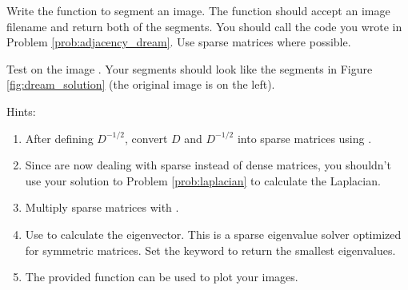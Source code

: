 \begin{problem} Write the function  to segment an image.
The function should accept an image filename and return both of the segments.
You should call the code you wrote in Problem \ref{prob:adjacency_dream}.
Use sparse matrices where possible.


Test on the image .
Your segments should look like the segments in Figure \ref{fig:dream_solution} (the original image is on the left).

Hints:
\begin{enumerate}
\item After defining $D^{-1/2}$, convert $D$ and $D^{-1/2}$ into sparse matrices using .
\item Since are now dealing with sparse instead of dense matrices, you shouldn't use your solution to Problem \ref{prob:laplacian} to calculate the Laplacian.

\item Multiply sparse matrices with .

\item Use  to calculate the eigenvector. This is a sparse eigenvalue solver optimized for symmetric matrices.
Set the keyword  to return the smallest eigenvalues.

\item The provided function  can be used to plot your images.

\end{enumerate}

\end{problem}

